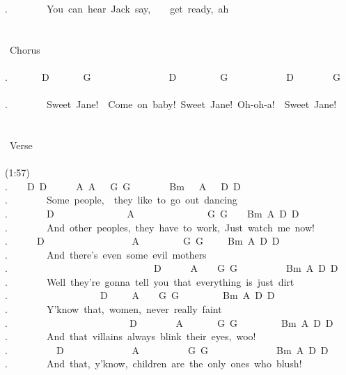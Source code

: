 {.\ \ \ \ \ \ \ \ You\ can\ hear\ Jack\ say,\ \ \ \ get\ ready,\ ah\\
\\
\\
\lbrack\ Chorus\rbrack\\
\\
.\ \ \ \ \ \ \ D\ \ \ \ \ \ \ G\ \ \ \ \ \ \ \ \ \ \ \ \ \ \ \ D\ \ \ \ \ \ \ \ \ G\ \ \ \ \ \ \ \ \ \ \ \ D\ \ \ \ \ \ \ \ G\ \ \ \ \\
.\ \ \ \ \ \ \ \ Sweet\ Jane!\ \ Come\ on\ baby!\ Sweet\ Jane!\ Oh-oh-a!\ \ Sweet\ Jane!\\
\\
\\
\lbrack\ Verse\rbrack\\
\\
(1:57)\\
.\ \ \ \ D\ D\ \ \ \ \ \ A\ A\ \ \ G\ G\ \ \ \ \ \ \ \ Bm\ \ \ A\ \ \ D\ D\\
.\ \ \ \ \ \ \ \ Some\ people,\ \ they\ like\ to\ go\ out\ dancing\\
.\ \ \ \ \ \ \ \ D\ \ \ \ \ \ \ \ \ \ \ \ \ \ \ A\ \ \ \ \ \ \ \ \ \ \ \ \ \ \ G\ G\ \ \ \ Bm\ A\ D\ D\\
.\ \ \ \ \ \ \ \ And\ other\ peoples,\ they\ have\ to\ work,\ Just\ watch\ me\ now!\ \ \\
.\ \ \ \ \ \ D\ \ \ \ \ \ \ \ \ \ \ \ \ \ \ \ \ \ A\ \ \ \ \ \ \ \ \ G\ G\ \ \ \ \ Bm\ A\ D\ D\\
.\ \ \ \ \ \ \ \ And\ there's\ even\ some\ evil\ mothers\\
.\ \ \ \ \ \ \ \ \ \ \ \ \ \ \ \ \ \ \ \ \ \ \ \ \ \ \ \ \ \ D\ \ \ \ \ \ A\ \ \ \ G\ G\ \ \ \ \ \ \ \ \ \ Bm\ A\ D\ D\\
.\ \ \ \ \ \ \ \ Well\ they're\ gonna\ tell\ you\ that\ everything\ is\ just\ dirt\\
.\ \ \ \ \ \ \ \ \ \ \ \ \ \ \ \ \ \ \ D\ \ \ \ \ A\ \ \ \ G\ G\ \ \ \ \ \ \ \ \ Bm\ A\ D\ D\\
.\ \ \ \ \ \ \ \ Y'know\ that,\ women,\ never\ really\ faint\\
.\ \ \ \ \ \ \ \ \ \ \ \ \ \ \ \ \ \ \ \ \ \ \ \ \ D\ \ \ \ \ \ \ \ A\ \ \ \ \ \ \ G\ G\ \ \ \ \ \ \ \ \ Bm\ A\ D\ D\\
.\ \ \ \ \ \ \ \ And\ that\ villains\ always\ blink\ their\ eyes,\ woo!\ \ \\
.\ \ \ \ \ \ \ \ \ \ D\ \ \ \ \ \ \ \ \ \ \ \ \ \ A\ \ \ \ \ \ \ \ \ \ G\ G\ \ \ \ \ \ \ \ \ \ \ \ \ \ Bm\ A\ D\ D\\
.\ \ \ \ \ \ \ \ And\ that,\ y'know,\ children\ are\ the\ only\ ones\ who\ blush!\\
}
